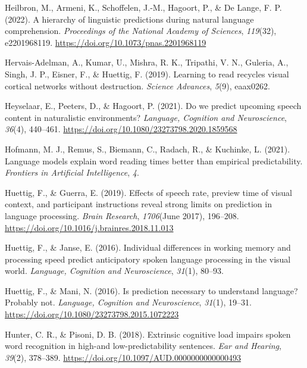 \documentclass[a4paper, nobind]{templates/ociamthesis}
\newlength{\cslhangindent}
\newenvironment{CSLReferences}[2] %
 {%
  \setlength{\parindent}{0pt}
  \ifodd #1
  \let\oldpar\par
  \def\par{\hangindent=\cslhangindent\oldpar}
  \fi
  \setlength{\parskip}{1mm}
  \setlength{\baselineskip}{6mm}
 }%
 {}
\begin{document}
\begin{CSLReferences}{1}{0}
\leavevmode{}%
Heilbron, M., Armeni, K., Schoffelen, J.-M., Hagoort, P., \& De Lange, F. P. (2022). A hierarchy of linguistic predictions during natural language comprehension. \emph{Proceedings of the National Academy of Sciences}, \emph{119}(32), e2201968119. \url{https://doi.org/10.1073/pnas.2201968119}

\leavevmode{}%
Hervais-Adelman, A., Kumar, U., Mishra, R. K., Tripathi, V. N., Guleria, A., Singh, J. P., Eisner, F., \& Huettig, F. (2019). Learning to read recycles visual cortical networks without destruction. \emph{Science Advances}, \emph{5}(9), eaax0262.

\leavevmode{}%
Heyselaar, E., Peeters, D., \& Hagoort, P. (2021). {Do we predict upcoming speech content in naturalistic environments?} \emph{Language, Cognition and Neuroscience}, \emph{36}(4), 440--461. \url{https://doi.org/10.1080/23273798.2020.1859568}

\leavevmode{}%
Hofmann, M. J., Remus, S., Biemann, C., Radach, R., \& Kuchinke, L. (2021). Language models explain word reading times better than empirical predictability. \emph{Frontiers in Artificial Intelligence}, \emph{4}.

\leavevmode{}%
Huettig, F., \& Guerra, E. (2019). {Effects of speech rate, preview time of visual context, and participant instructions reveal strong limits on prediction in language processing}. \emph{Brain Research}, \emph{1706}(June 2017), 196--208. \url{https://doi.org/10.1016/j.brainres.2018.11.013}

\leavevmode{}%
Huettig, F., \& Janse, E. (2016). Individual differences in working memory and processing speed predict anticipatory spoken language processing in the visual world. \emph{Language, Cognition and Neuroscience}, \emph{31}(1), 80--93.

\leavevmode{}%
Huettig, F., \& Mani, N. (2016). Is prediction necessary to understand language? Probably not. \emph{Language, Cognition and Neuroscience}, \emph{31}(1), 19--31. \url{https://doi.org/10.1080/23273798.2015.1072223}

\leavevmode{}%
Hunter, C. R., \& Pisoni, D. B. (2018). {Extrinsic cognitive load impairs spoken word recognition in high-and low-predictability sentences}. \emph{Ear and Hearing}, \emph{39}(2), 378--389. \url{https://doi.org/10.1097/AUD.0000000000000493}


\end{CSLReferences}
\end{document}
